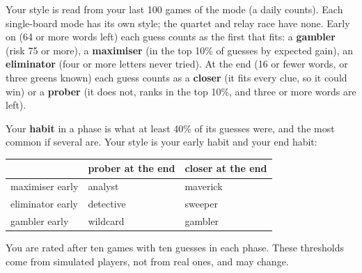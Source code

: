 \documentclass[11pt]{article}
\begin{document}
Your style is read from your last 100 games of the mode (a daily counts). Each single-board mode has its own style; the quartet and relay race have none. Early on (64 or more words left) each guess counts
as the first that fits: a \textbf{gambler} (risk 75 or more), a \textbf{maximiser} (in the top
10\% of guesses by expected gain), an \textbf{eliminator} (four or more letters never tried).
At the end (16 or fewer words, or three greens known) each guess counts as a \textbf{closer} (it
fits every clue, so it could win) or a \textbf{prober} (it does not, ranks in the top 10\%, and
three or more words are left).

Your \textbf{habit} in a phase is what at least 40\% of its guesses were, and the most common if
several are. Your style is your early habit and your end habit:

\begin{center}
\begin{tabular}{lll}
\toprule
 & prober at the end & closer at the end\\
\midrule
maximiser early & analyst & maverick\\
eliminator early & detective & sweeper\\
gambler early & wildcard & gambler\\
\bottomrule
\end{tabular}
\end{center}

You are rated after ten games with ten guesses in each phase. These thresholds come from simulated
players, not from real ones, and may change.
\end{document}
